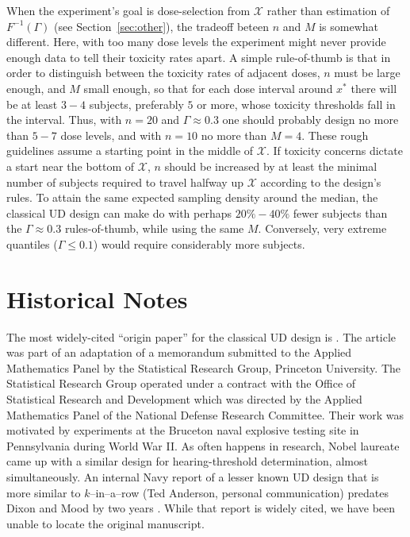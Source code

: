 When the experiment's goal is dose-selection from $\mathcal{X}$ rather than estimation of $F^{-1}(\Gamma)$ (see Section~\ref{sec:other}), the tradeoff beteen $n$ and $M$ is somewhat different. Here, with too many dose levels the experiment might never provide enough data to tell their toxicity rates apart. A simple rule-of-thumb is that in order to distinguish between the toxicity rates of adjacent doses, $n$ must be large enough, and $M$ small enough, so that for each dose interval around $x^*$ there will be at least $3-4$ subjects, preferably $5$ or more, whose toxicity thresholds fall in the interval.  Thus, with $n=20$ and $\Gamma\approx 0.3$ one should probably design no more than $5-7$ dose levels, and with $n=10$ no more than $M=4$. These rough guidelines assume a starting point in the middle of $\mathcal{X}$. If toxicity concerns dictate a start near the bottom of $\mathcal{X}$, $n$ should be increased by at least the minimal number of subjects required to travel halfway up $\mathcal{X}$ according to the design's rules. To attain the same expected sampling density around the median, the classical UD design can make do with perhaps $20\%-40\%$ fewer subjects than the $\Gamma\approx 0.3$ rules-of-thumb, while using the same $M$. Conversely, very extreme quantiles ($\Gamma\leq 0.1$) would require considerably more subjects.

\chapter{Historical Notes}\label{sec:history}

The most widely-cited ``origin paper'' for the classical UD design is \cite{Dixo:Mood:Amet:1948}. The article was part of an adaptation of a memorandum submitted to the Applied Mathematics Panel by the Statistical Research Group, Princeton University.  The Statistical Research Group operated under a contract with the Office of Statistical Research and Development which was directed by the Applied Mathematics Panel of the National Defense Research Committee.  Their work was motivated by experiments at the Bruceton naval explosive testing site in Pennsylvania during World War II. As often happens in research, Nobel laureate \cite{vonB:anew:1947} came up with a similar design for hearing-threshold determination, almost simultaneously.  An internal Navy report of a lesser known UD design that is more similar to $k$--in--a--row (Ted Anderson, personal communication) predates Dixon and Mood by two years  \citep{Ande:McCa:Tuke:Stai:1946}. While that report is widely cited, we have been unable to locate the original manuscript.

